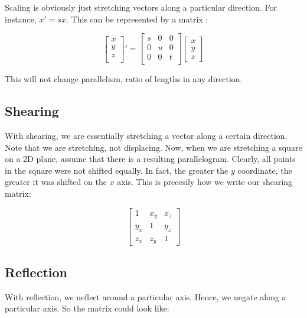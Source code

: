 Scaling is obviously just stretching vectors along a particular direction. For instance, $x'=sx$. This can be represented by a matrix :

\begin{equation}
    \begin{bmatrix}
    x \\
    y\\
    z\\
    \end{bmatrix}' = \begin{bmatrix}
    s & 0 & 0 \\
    0 & u & 0 \\
    0 & 0 & t \\
    \end{bmatrix} \begin{bmatrix}
    x \\
    y\\
    z
    \end{bmatrix}
\end{equation}

This will not change parallelism, ratio of lengths in any direction.

\subsection{Shearing}

With shearing, we are essentially stretching a vector along a certain direction. Note that we are stretching, not displacing. Now, when we are stretching a square on a 2D plane, assume that there is a resulting parallelogram. Clearly, all points in the square were not shifted equally. In fact, the greater the $y$ coordinate, the greater it was shifted on the $x$ axis. This is precesily how we write our shearing matrix:

\begin{equation}
    \begin{bmatrix}
    1 & x_y & x_z \\
    y_x & 1 & y_z \\
    z_x & z_y & 1
    \end{bmatrix}
\end{equation}

\subsection{Reflection}

With reflection, we neflect around a particular axis. Hence, we negate along a particular axis. So the matrix could look like:


